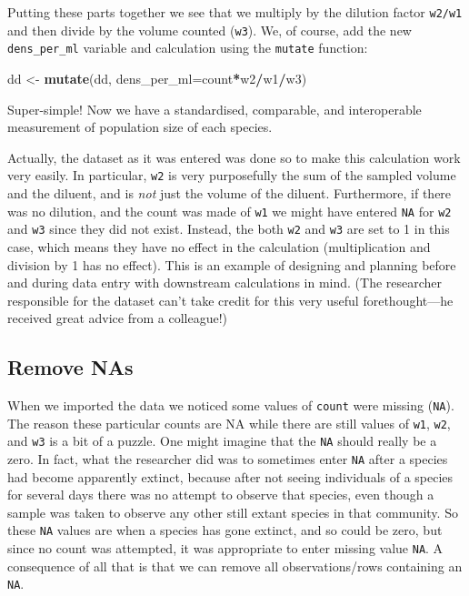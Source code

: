 \documentclass[]{book}
\makeatletter
\newenvironment{Shaded}{\begin{snugshade}}{\end{snugshade}}
\newcommand{\DataTypeTok}[1]{\textcolor[rgb]{0.13,0.29,0.53}{#1}}
\newcommand{\KeywordTok}[1]{\textcolor[rgb]{0.13,0.29,0.53}{\textbf{#1}}}
\newcommand{\NormalTok}[1]{#1}
\newcommand{\OperatorTok}[1]{\textcolor[rgb]{0.81,0.36,0.00}{\textbf{#1}}}
\newcommand{\StringTok}[1]{\textcolor[rgb]{0.31,0.60,0.02}{#1}}
\newenvironment{kframe}{%
\medskip{}
\setlength{\fboxsep}{.8em}
 \def\at@end@of@kframe{}%
 \ifinner\ifhmode%
  \def\at@end@of@kframe{\end{minipage}}%
  \begin{minipage}{\columnwidth}%
 \fi\fi%
 \def\FrameCommand##1{\hskip\@totalleftmargin \hskip-\fboxsep
 \colorbox{shadecolor}{##1}\hskip-\fboxsep
     \hskip-\linewidth \hskip-\@totalleftmargin \hskip\columnwidth}%
 \MakeFramed {\advance\hsize-\width
   \@totalleftmargin\z@ \linewidth\hsize
   \@setminipage}}%
 {\par\unskip\endMakeFramed%
 \at@end@of@kframe}
\newenvironment{rmdblock}[1]
  {
  \begin{itemize}
  \renewcommand{\labelitemi}{
    \raisebox{-.7\height}[0pt][0pt]{
      {\setkeys{Gin}{width=3em,keepaspectratio}\texttt{[image: images/\#1]}}
    }
  }
  \setlength{\fboxsep}{1em}
  \begin{kframe}
  \item
  }
  {
  \end{kframe}
  \end{itemize}
  }
\newenvironment{efficiency}
  {\begin{rmdblock}{efficiency}}
  {\end{rmdblock}}
\makeatother
\begin{document}
Putting these parts together we see that we multiply by the dilution factor \texttt{w2/w1} and then divide by the volume counted (\texttt{w3}). We, of course, add the new \texttt{dens\_per\_ml} variable and calculation using the \texttt{mutate} function:

\begin{Shaded}
\begin{Highlighting}[]
\NormalTok{dd <-}\StringTok{ }\KeywordTok{mutate}\NormalTok{(dd, }\DataTypeTok{dens_per_ml=}\NormalTok{count}\OperatorTok{*}\NormalTok{w2}\OperatorTok{/}\NormalTok{w1}\OperatorTok{/}\NormalTok{w3)}
\end{Highlighting}
\end{Shaded}

Super-simple! Now we have a standardised, comparable, and interoperable measurement of population size of each species.

\begin{efficiency}
Actually, the dataset as it was entered was done so to make this
calculation work very easily. In particular, \texttt{w2} is very
purposefully the sum of the sampled volume and the diluent, and is
\emph{not} just the volume of the diluent. Furthermore, if there was no
dilution, and the count was made of \texttt{w1} we might have entered
\texttt{NA} for \texttt{w2} and \texttt{w3} since they did not exist.
Instead, the both \texttt{w2} and \texttt{w3} are set to 1 in this case,
which means they have no effect in the calculation (multiplication and
division by 1 has no effect). This is an example of designing and
planning before and during data entry with downstream calculations in
mind. (The researcher responsible for the dataset can't take credit for
this very useful forethought---he received great advice from a
colleague!)
\end{efficiency}

\hypertarget{remove-nas}{%
\subsection{Remove NAs}\label{remove-nas}}

When we imported the data we noticed some values of \texttt{count} were missing (\texttt{NA}). The reason these particular counts are NA while there are still values of \texttt{w1}, \texttt{w2}, and \texttt{w3} is a bit of a puzzle. One might imagine that the \texttt{NA} should really be a zero. In fact, what the researcher did was to sometimes enter \texttt{NA} after a species had become apparently extinct, because after not seeing individuals of a species for several days there was no attempt to observe that species, even though a sample was taken to observe any other still extant species in that community. So these \texttt{NA} values are when a species has gone extinct, and so could be zero, but since no count was attempted, it was appropriate to enter missing value \texttt{NA}. A consequence of all that is that we can remove all observations/rows containing an \texttt{NA}.
\end{document}
